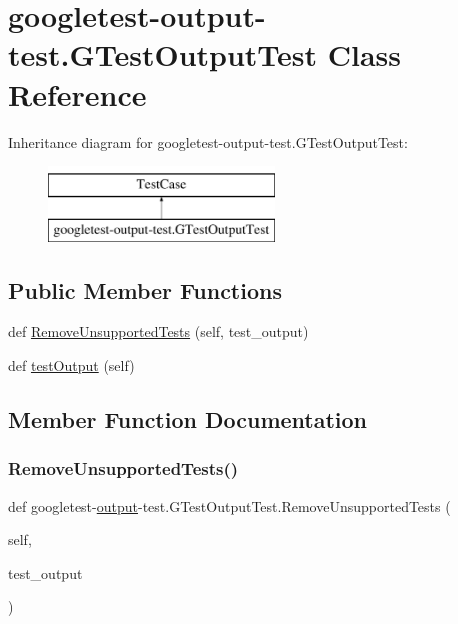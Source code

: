 \hypertarget{classgoogletest-output-test_1_1GTestOutputTest}{}\section{googletest-\/output-\/test.G\+Test\+Output\+Test Class Reference}
\label{classgoogletest-output-test_1_1GTestOutputTest}
Inheritance diagram for googletest-\/output-\/test.G\+Test\+Output\+Test\+:\begin{figure}[H]
\begin{center}
\leavevmode
\includegraphics[height=2.000000cm]{classgoogletest-output-test_1_1GTestOutputTest}
\end{center}
\end{figure}
\subsection*{Public Member Functions}
\begin{DoxyCompactItemize}
\item 
def \mbox{\hyperlink{classgoogletest-output-test_1_1GTestOutputTest_af058c7917b05d06b0e6249061db264a3}{Remove\+Unsupported\+Tests}} (self, test\+\_\+output)
\item 
def \mbox{\hyperlink{classgoogletest-output-test_1_1GTestOutputTest_a4ab77925377e6c837d33f07960a31212}{test\+Output}} (self)
\end{DoxyCompactItemize}


\subsection{Member Function Documentation}
\mbox{\label{classgoogletest-output-test_1_1GTestOutputTest_af058c7917b05d06b0e6249061db264a3}} 
\subsubsection{\texorpdfstring{RemoveUnsupportedTests()}{RemoveUnsupportedTests()}}
{\footnotesize\ttfamily def googletest-\/\mbox{\hyperlink{namespacegoogletest-output-test_ab3df9ce09186215a36c30454cf282417}{output}}-\/test.\+G\+Test\+Output\+Test.\+Remove\+Unsupported\+Tests (\begin{DoxyParamCaption}\item[{}]{self,  }\item[{}]{test\+\_\+output }\end{DoxyParamCaption})}

